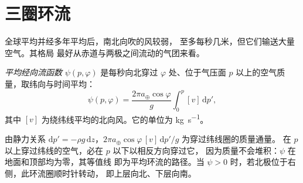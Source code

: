 \section{三圈环流}\label{sec:b1:atmospheric-circulation:cells}

全球平均并经多年平均后，南北向吹的风较弱，
至多每秒几米，但它们输送大量空气。其格局
最好从赤道与两极之间流动的气团来看。

\begin{definition}[平均经向流函数]\label{def:b1:atmospheric-circulation:streamfunction}
\emph{平均经向流函数}
$\psi(p, \varphi)$ 是每秒向北穿过
$\varphi$ 处、位于气压面 $p$ 以上的空气质量，取纬向与时间平均：
\[
  \psi(p, \varphi) = \frac{2\pi a_\oplus\cos\varphi}{g}\int_0^p [v]\,\mathrm dp' ,
\]
其中 $[v]$ 为绕纬线平均的北向风。它的单位为
\unit{kg.s^{-1}}。
\end{definition}

由静力关系 $\mathrm dp' = -\rho g\,\mathrm dz$，$2\pi a_\oplus
\cos\varphi\,[v]\,\mathrm dp'/g$ 为穿过纬线圈的质量通量。
在 $p$ 以上穿过纬线的空气，必在 $p$ 以下以相反方向穿过它，
因为质量不会堆积：$\psi$ 在地面和顶部均为零，其等值线
即为平均环流的路径。当 $\psi > 0$ 时，若北极位于右侧，此环流圈顺时针转动，
即上层向北、下层向南。

